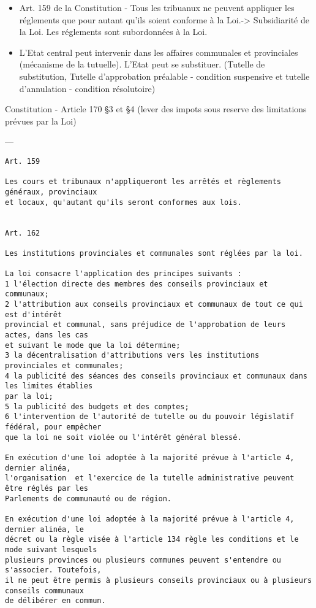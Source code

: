 \documentclass{book}
\begin{document}
\begin{itemize}
\item Art. 159 de la Constitution - Tous les tribuanux ne peuvent appliquer les réglements que pour autant qu'ils soient conforme à la Loi.-> Subsidiarité de la Loi. Les réglements sont subordonnées à la Loi.
\item L'Etat central peut intervenir dans les affaires communales et provinciales (mécanisme de la tutuelle). L'Etat peut se substituer. (Tutelle de substitution, Tutelle d'approbation préalable - condition suspensive et tutelle d'annulation - condition résolutoire)
\end{itemize}
\null
Constitution - Article 170 §3 et §4 (lever des impots sous reserve des limitations prévues par la Loi)

---

\begin{verbatim}
Art. 159

Les cours et tribunaux n'appliqueront les arrêtés et règlements généraux, provinciaux 
et locaux, qu'autant qu'ils seront conformes aux lois.


Art. 162

Les institutions provinciales et communales sont réglées par la loi.

La loi consacre l'application des principes suivants :
1 l'élection directe des membres des conseils provinciaux et communaux;
2 l'attribution aux conseils provinciaux et communaux de tout ce qui est d'intérêt 
provincial et communal, sans préjudice de l'approbation de leurs actes, dans les cas 
et suivant le mode que la loi détermine;
3 la décentralisation d'attributions vers les institutions provinciales et communales;
4 la publicité des séances des conseils provinciaux et communaux dans les limites établies 
par la loi;
5 la publicité des budgets et des comptes;
6 l'intervention de l'autorité de tutelle ou du pouvoir législatif fédéral, pour empêcher 
que la loi ne soit violée ou l'intérêt général blessé.

En exécution d'une loi adoptée à la majorité prévue à l'article 4, dernier alinéa, 
l'organisation  et l'exercice de la tutelle administrative peuvent être réglés par les 
Parlements de communauté ou de région.

En exécution d'une loi adoptée à la majorité prévue à l'article 4, dernier alinéa, le 
décret ou la règle visée à l'article 134 règle les conditions et le mode suivant lesquels 
plusieurs provinces ou plusieurs communes peuvent s'entendre ou s'associer. Toutefois, 
il ne peut être permis à plusieurs conseils provinciaux ou à plusieurs conseils communaux 
de délibérer en commun.


\end{verbatim}
\end{document}

